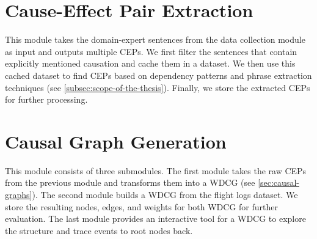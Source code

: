 \section{Cause-Effect Pair Extraction}\label{sec:cause-effect-pair-extraction-pipeline}
This module takes the domain-expert sentences from the data collection module as input and outputs multiple \ac{CEP}s.
We first filter the sentences that contain explicitly mentioned causation and cache them in a dataset.
We then use this cached dataset to find \ac{CEP}s based on dependency patterns and phrase extraction techniques (see \autoref{subsec:scope-of-the-thesis}).
Finally, we store the extracted \ac{CEP}s for further processing.


\section{Causal Graph Generation}\label{sec:causal-graph-generation-pipeline}
This module consists of three submodules.
The first module takes the raw \ac{CEP}s from the previous module and transforms them into a \ac{WDCG} (see \autoref{sec:causal-graphs}).
The second module builds a \ac{WDCG} from the flight logs dataset.
We store the resulting nodes, edges, and weights for both \ac{WDCG} for further evaluation.
The last module provides an interactive tool for a \ac{WDCG} to explore the structure and trace events to root nodes back.


